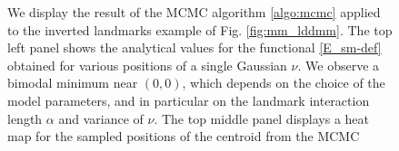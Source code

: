 \documentclass[runningheads]{llncs}
\begin{document}
\begin{figure}[h!]
    \caption{We display the result of the MCMC algorithm \ref{algo:mcmc} applied 
    to the inverted landmarks example of Fig. \ref{fig:mm_lddmm}. 
    The top left 
    panel shows the analytical values for the functional \eqref{E_sm-def} obtained 
    for various positions of a single Gaussian $\nu$. We observe a bimodal minimum 
    near $(0,0)$, which depends on the choice of the model parameters, and in particular
    on the landmark interaction length $\alpha$ and variance of $\nu$. 
    The top middle panel
    displays a heat map for the sampled positions of the centroid from the MCMC
}
\end{figure}
\end{document}
